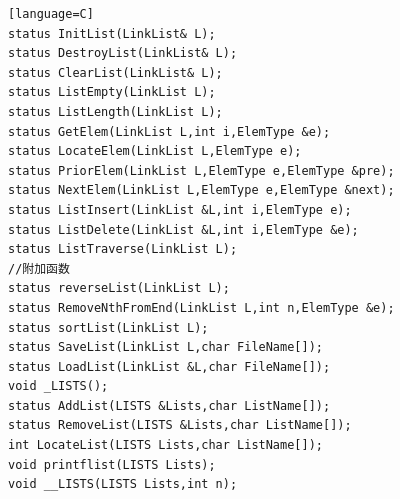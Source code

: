 \documentclass[supercite]{Experimental_Report}
\theoremstyle{definition}
\begin{document}
\begin{sloppypar}
\begin{lstlisting}[breaklines][language=C]
status InitList(LinkList& L);
status DestroyList(LinkList& L);
status ClearList(LinkList& L);
status ListEmpty(LinkList L);
status ListLength(LinkList L);
status GetElem(LinkList L,int i,ElemType &e);
status LocateElem(LinkList L,ElemType e); 
status PriorElem(LinkList L,ElemType e,ElemType &pre);
status NextElem(LinkList L,ElemType e,ElemType &next);
status ListInsert(LinkList &L,int i,ElemType e);
status ListDelete(LinkList &L,int i,ElemType &e);
status ListTraverse(LinkList L);  
//附加函数 
status reverseList(LinkList L);
status RemoveNthFromEnd(LinkList L,int n,ElemType &e);
status sortList(LinkList L);
status SaveList(LinkList L,char FileName[]);
status LoadList(LinkList &L,char FileName[]);
void _LISTS();
status AddList(LISTS &Lists,char ListName[]);
status RemoveList(LISTS &Lists,char ListName[]);
int LocateList(LISTS Lists,char ListName[]);
void printflist(LISTS Lists);
void __LISTS(LISTS Lists,int n);
 

\end{lstlisting}
\end{sloppypar}
\end{document}
